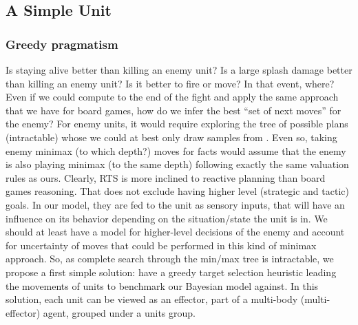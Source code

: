 \subsection{A Simple Unit}
\subsubsection{Greedy pragmatism}
Is staying alive better than killing an enemy unit? Is a large splash damage better than killing an enemy unit? Is it better to fire or move? In that event, where? Even if we could compute to the end of the fight and apply the same approach that we have for board games, how do we infer the best ``set of next moves'' for the enemy? %
For enemy units, it would require exploring the tree of possible plans (intractable) whose we could at best only draw samples from \citep{UCT}. Even so, taking enemy minimax (to which depth?) moves for facts would assume that the enemy is also playing minimax (to the same depth) following exactly the same valuation rules as ours. Clearly, RTS  is more inclined to reactive planning than board games reasoning. That does not exclude having higher level (strategic and tactic) goals. In our model, they are fed to the unit as sensory inputs, that will have an influence on its behavior depending on the situation/state the unit is in. 
We should at least have a model for higher-level decisions of the enemy and account for uncertainty of moves that could be performed in this kind of minimax approach. So, as complete search through the min/max tree is intractable, we propose a first simple solution: have a greedy target selection heuristic leading the movements of units to benchmark our Bayesian model against. In this solution, each unit can be viewed as an effector, part of a multi-body (multi-effector) agent, grouped under a units group. 

